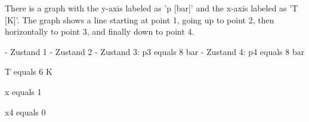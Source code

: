 There is a graph with the y-axis labeled as 'p [bar]' and the x-axis labeled as 'T [K]'. The graph shows a line starting at point 1, going up to point 2, then horizontally to point 3, and finally down to point 4. 

- Zustand 1
- Zustand 2
- Zustand 3: p3 equals 8 bar
- Zustand 4: p4 equals 8 bar

T equals 6 K

x equals 1

x4 equals 0